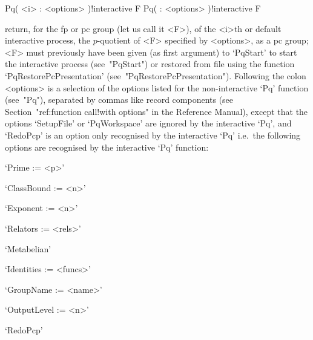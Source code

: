 \>Pq( <i> : <options> )!{interactive} F
\>Pq( : <options> )!{interactive} F

return, for the fp  or pc group (let us call it  <F>), of the <i>th or
default  interactive   {\ANUPQ}  process,  the   $p$-quotient  of  <F>
specified by <options>,  as a pc group; <F>  must previously have been
given  (as  first argument)  to  `PqStart'  to  start the  interactive
{\ANUPQ}  process  (see~"PqStart") or  restored  from  file using  the
function  `PqRestorePcPresentation'  (see~"PqRestorePcPresentation").  
Following the colon <options> is a selection of the options listed for
the non-interactive `Pq' function (see~"Pq"), separated by commas like
record components (see Section~"ref:function call!with options" in the
{\GAP}  Reference  Manual), except  that  the  options `SetupFile'  or
`PqWorkspace' are ignored by the interactive `Pq', and `RedoPcp' is an
option  only recognised  by  the interactive  `Pq' i.e.~the  following
options are recognised by the interactive `Pq' function:

\beginlist%

\item{}`Prime := <p>'

\item{}`ClassBound := <n>'

\item{}`Exponent := <n>'

\item{}`Relators := <rels>'

\item{}`Metabelian'

\item{}`Identities := <funcs>'

\item{}`GroupName := <name>'

\item{}`OutputLevel := <n>'

\item{}`RedoPcp'

\endlist

